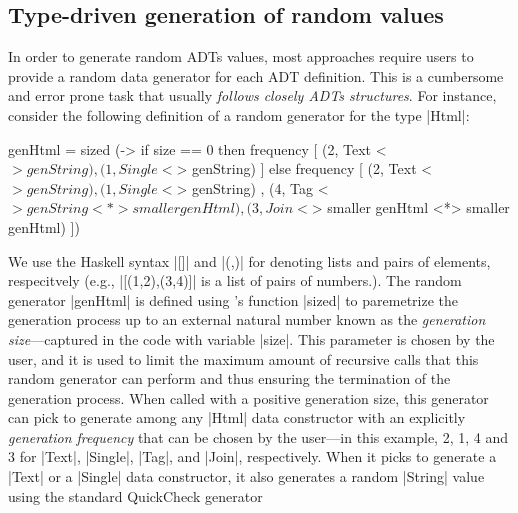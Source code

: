 

\subsection{Type-driven generation of random values}

In order to generate random ADTs values, most approaches require users to provide
a random data generator for each ADT definition.
%
This is a cumbersome and error prone task that usually \emph{follows closely
  ADTs structures}.
%
For instance, consider the following definition of a \quickcheck random
generator for the type |Html|:
%
\begin{code}
genHtml = sized (\size ->
  if size == 0
  then frequency
  [  (2,  Text    <$> genString)
  ,  (1,  Single  <$> genString) ]
  else frequency
  [  (2,  Text    <$> genString)
  ,  (1,  Single  <$> genString)
  ,  (4,  Tag     <$> genString <*> smaller genHtml)
  ,  (3,  Join    <$> smaller genHtml <*> smaller genHtml) ])
\end{code} %
%
We use the Haskell syntax |[]| and |(,)| for denoting lists and pairs of
elements, respecitvely (e.g., |[(1,2),(3,4)]| is a list of pairs of numbers.).
%
The random generator |genHtml| is defined using \quickcheck's function |sized|
to paremetrize the generation process up to an external natural number known as
the \emph{generation size}---captured in the code with variable |size|.
%
This parameter is chosen by the user, and it is used to limit the maximum amount
of recursive calls that this random generator can perform and thus ensuring
the termination of the generation process.
%
When called with a positive generation size, this generator can pick to generate
among any |Html| data constructor with an explicitly \emph{generation frequency}
that can be chosen by the user---in this example, 2, 1, 4 and 3 for |Text|,
|Single|, |Tag|, and |Join|, respectively.
%
When it picks to generate a |Text| or a |Single| data constructor, it also
generates a random |String| value using the standard QuickCheck generator
